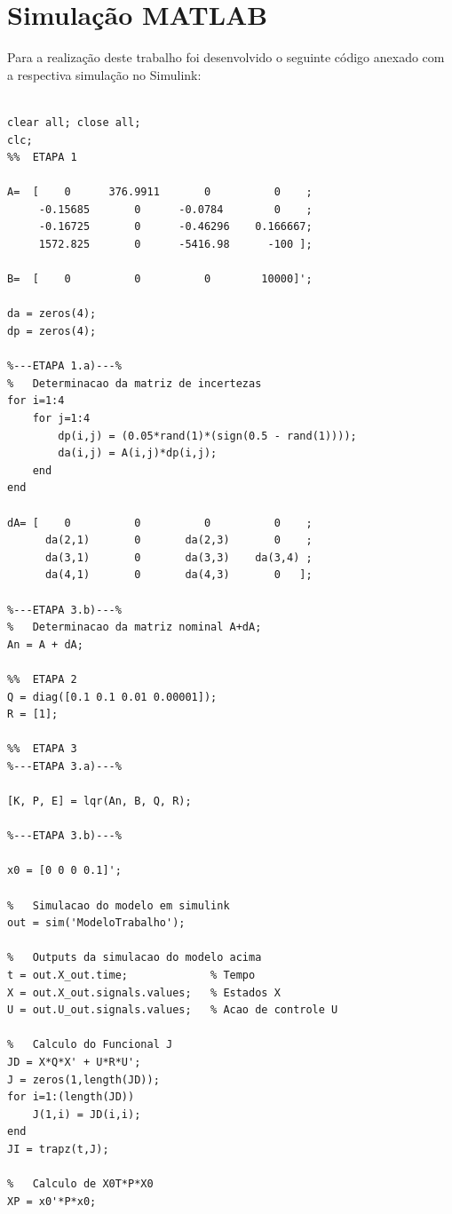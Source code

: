 \documentclass[a4paper,12pt]{article}
\begin{document}
\newpage

\tableofcontents

\newpage

\section{Simulação MATLAB}

Para a realização deste trabalho foi desenvolvido o seguinte código anexado com a respectiva simulação no Simulink:

\begin{lstlisting}

clear all; close all; 
clc;
%%  ETAPA 1

A=  [    0      376.9911       0          0    ;
     -0.15685       0      -0.0784        0    ;
     -0.16725       0      -0.46296    0.166667;
     1572.825       0      -5416.98      -100 ];

B=  [    0          0          0        10000]';

da = zeros(4);
dp = zeros(4);

%---ETAPA 1.a)---%
%   Determinacao da matriz de incertezas
for i=1:4
    for j=1:4
        dp(i,j) = (0.05*rand(1)*(sign(0.5 - rand(1))));
        da(i,j) = A(i,j)*dp(i,j);
    end
end

dA= [    0          0          0          0    ;
      da(2,1)       0       da(2,3)       0    ;
      da(3,1)       0       da(3,3)    da(3,4) ;
      da(4,1)       0       da(4,3)       0   ];
  
%---ETAPA 3.b)---%
%   Determinacao da matriz nominal A+dA;
An = A + dA;                    

%%  ETAPA 2
Q = diag([0.1 0.1 0.01 0.00001]);   
R = [1];

%%  ETAPA 3
%---ETAPA 3.a)---%

[K, P, E] = lqr(An, B, Q, R);

%---ETAPA 3.b)---%

x0 = [0 0 0 0.1]';

%   Simulacao do modelo em simulink
out = sim('ModeloTrabalho');

%   Outputs da simulacao do modelo acima
t = out.X_out.time;             % Tempo
X = out.X_out.signals.values;   % Estados X
U = out.U_out.signals.values;   % Acao de controle U

%   Calculo do Funcional J
JD = X*Q*X' + U*R*U';
J = zeros(1,length(JD));
for i=1:(length(JD))
    J(1,i) = JD(i,i);
end
JI = trapz(t,J);

%   Calculo de X0T*P*X0
XP = x0'*P*x0;


\end{lstlisting}
\end{document}
